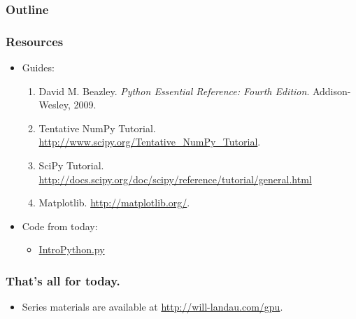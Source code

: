 \documentclass[handout]{beamer}
\numberwithin{equation}{section}
\begin{document}
\begin{frame}
\frametitle{Outline}
\tableofcontents
\end{frame}

\begin{frame}
\frametitle{Resources} \small

\begin{itemize}
\item Guides:
\begin{enumerate}
\item David M. Beazley. \emph{Python Essential Reference: Fourth Edition}. Addison-Wesley, 2009.
\pause \item Tentative NumPy Tutorial. \url{http://www.scipy.org/Tentative\_NumPy\_Tutorial}.
\pause \item SciPy Tutorial. \url{http://docs.scipy.org/doc/scipy/reference/tutorial/general.html}
\item Matplotlib. \url{http://matplotlib.org/}.
\end{enumerate}
\pause \item Code from today:
\begin{itemize}
\item \href{http://will-landau.com/gpu/Code/Python/Basic_Python/IntroPython.py}{IntroPython.py}
\end{itemize}
\end{itemize}
\end{frame}


\begin{frame}
\frametitle{That's all for today.}
\begin{itemize}
\item Series materials are available at \url{http://will-landau.com/gpu}.
\end{itemize}
\end{frame}
\end{document}
